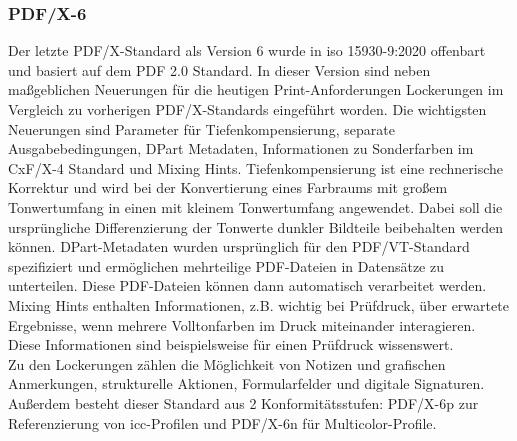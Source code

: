 \subsubsection{PDF/X-6}
Der letzte PDF/X-Standard als Version 6 wurde in \gls{iso} 15930-9:2020 offenbart und basiert auf dem PDF 2.0 Standard. In dieser Version sind neben maßgeblichen Neuerungen für die heutigen Print-Anforderungen Lockerungen im Vergleich zu vorherigen PDF/X-Standards eingeführt worden. Die wichtigsten Neuerungen sind Parameter für Tiefenkompensierung, separate Ausgabebedingungen, DPart Metadaten, Informationen zu Sonderfarben im CxF/X-4 Standard und Mixing Hints. \cite{proj-consult}
Tiefenkompensierung ist eine rechnerische Korrektur und wird bei der Konvertierung eines Farbraums mit großem Tonwertumfang in einen mit kleinem Tonwertumfang angewendet. Dabei soll die ursprüngliche Differenzierung der Tonwerte dunkler Bildteile beibehalten werden können. \cite{tiefen} 
DPart-Metadaten wurden ursprünglich für den PDF/VT-Standard spezifiziert und ermöglichen mehrteilige PDF-Dateien in Datensätze zu unterteilen. Diese PDF-Dateien können dann automatisch verarbeitet werden. \cite{pdfa-dpart} Mixing Hints enthalten Informationen, z.B. wichtig bei Prüfdruck, über erwartete Ergebnisse, wenn mehrere Volltonfarben im Druck miteinander interagieren. Diese Informationen sind beispielsweise für einen Prüfdruck wissenswert. \cite{mixing-hints} \\
Zu den Lockerungen zählen die Möglichkeit von Notizen und grafischen Anmerkungen, strukturelle Aktionen, Formularfelder und digitale Signaturen. Außerdem besteht dieser Standard aus 2 Konformitätsstufen: PDF/X-6p zur Referenzierung von \gls{icc}-Profilen und PDF/X-6n für Multicolor-Profile. \cite{proj-consult}


